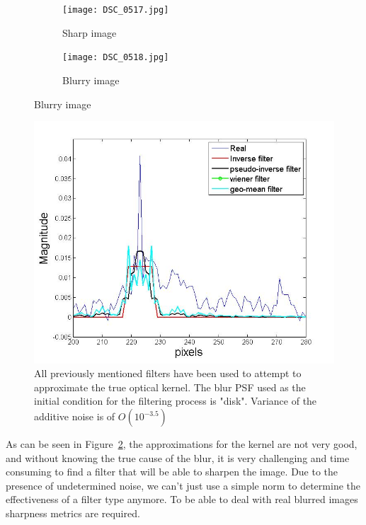 \begin{figure}
        \centering
        \begin{subfigure}[b]{0.4\textwidth}
                \centering
                \texttt{[image: DSC\_0517.jpg]}
                \caption{Sharp image}
                
        \end{subfigure}
        \begin{subfigure}[b]{0.4\textwidth}
                \centering
                \texttt{[image: DSC\_0518.jpg]}
                \caption{Blurry image} 
        \end{subfigure}
 \label{fig:barrels}
\end{figure}

\begin{figure}[h!]

  \centering
                \centering
                \includegraphics[width=.5\textwidth]{true_kernel.jpg}
                \caption{All previously mentioned filters have been used to attempt to approximate the true optical kernel. The blur PSF used as the initial condition for the filtering process is "disk". Variance of the additive noise is of $O(10^{-3.5})$ }
                \label{fig:true_kernel}
\end{figure}
  
As can be seen in Figure~\ref{fig:true_kernel}, the approximations for the kernel are not very good, and without knowing the true cause of the blur, it is very challenging and time consuming to find a filter that will be able to sharpen the image. Due to the presence of undetermined noise, we can't just use a simple norm to determine the effectiveness of a filter type anymore. To be able to deal with real blurred images sharpness metrics are required.